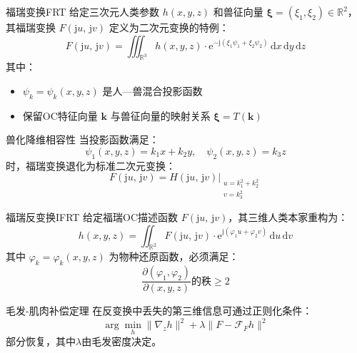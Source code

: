 \documentclass[lang=cn,newtx,10pt,scheme=chinese]{elegantbook}
\newcommand{\md}{\mathrm{d}}
\newcommand{\me}{\mathrm{e}}
\newcommand{\mj}{\mathrm{j}}
\begin{document}
\begin{definition}{福瑞变换FRT}
    给定三次元人类参数 \( h(x,y,z) \) 和兽征向量 \(\bm{\xi} = (\xi_1,\xi_2) \in \mathbb{R}^2\)，其福瑞变换 \( F(\mj u,\,\mj v) \) 定义为二次元变换的特例：
    \[
        F(\mj u,\,\mj v) = \iiint_{\mathbb{R}^3} h(x,y,z) \cdot \me^{-\mj (\xi_1\psi_1 + \xi_2\psi_2)} \,\md x\,\md y\,\md z
    \]
    其中：
    \begin{itemize}
        \item \(\psi_k = \psi_k(x,y,z)\) 是人—兽混合投影函数
        \item 保留OC特征向量 \(\bm{k}\) 与兽征向量的映射关系 \(\bm{\xi} = T(\bm{k})\)
    \end{itemize}
\end{definition}

\begin{theorem}{兽化降维相容性}
    当投影函数满足：
    \[
        \psi_1(x,y,z) = k_1x + k_2y,\quad \psi_2(x,y,z) = k_3z
    \]
    时，福瑞变换退化为标准二次元变换：
    \[
        F(\mj u,\,\mj v) = H(\mj u,\,\mj v)\big|_{\substack{u=k_1^2+k_2^2 \\ v=k_3^2}}
    \]
\end{theorem}

\begin{definition}{福瑞反变换IFRT}
    给定福瑞OC描述函数 \( F(\mj u,\,\mj v) \)，其三维人类本家重构为：
    \[
        h(x,y,z) = \iint_{\mathbb{R}^2} F(\mj u,\,\mj v) \cdot \me^{\mj (\varphi_1 u + \varphi_2 v)} \,\md u\,\md v
    \]
    其中 \(\varphi_k = \varphi_k(x,y,z)\) 为物种还原函数，必须满足：
    \[
        \frac{\partial (\varphi_1,\varphi_2)}{\partial (x,y,z)} \text{的秩} \geq 2
    \]
\end{definition}

\begin{theorem}{毛发-肌肉补偿定理}
    在反变换中丢失的第三维信息可通过正则化条件：
    \[
        \arg\min_h \| \nabla_z h \|^2 + \lambda \| F - \mathcal{F}_F h \|^2
    \]
    部分恢复，其中\(\lambda\)由毛发密度决定。
\end{theorem}
\end{document}
